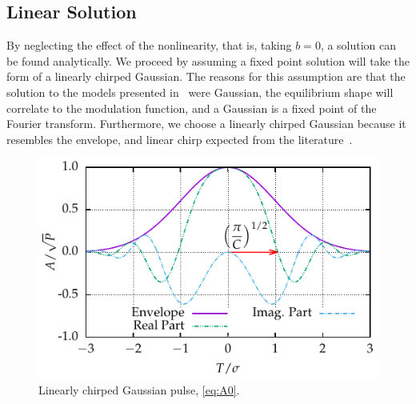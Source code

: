 \documentclass[9pt,twocolumn,twoside]{osajnl}
\begin{document}
\subsection{Linear Solution}
By neglecting the effect of the nonlinearity, that is, taking $b = 0$, a solution can be found analytically. We proceed by assuming a fixed point solution will take the form of a linearly chirped Gaussian. The reasons for this assumption are that the solution to the models presented in~\cite{cutler1955, siegman1969, kuizenga1970a, martinez1984, martinez1985} were Gaussian, the equilibrium shape will correlate to the modulation function, and a Gaussian is a fixed point of the Fourier transform. Furthermore, we choose a linearly chirped Gaussian because it resembles the envelope, and linear chirp expected from the literature~\cite{burgoyne2014, haus1975, haus1996, haus2000, usechak2005}.

\begin{figure}[tbp]
	\centering
	\includegraphics{Figures/Sample_Gauss}
	\caption{Linearly chirped Gaussian pulse, \eqref{eq:A0}.}
	\label{fig:samplegauss}
\end{figure}
\end{document}
